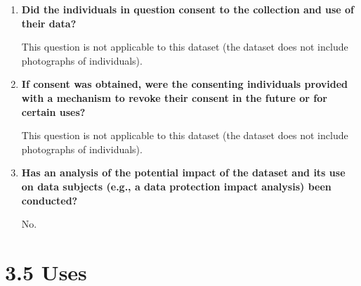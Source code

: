 \documentclass[a4paper,12pt]{article}
\begin{document}
\begin{enumerate}
    \item \textbf{Did the individuals in question consent to the collection and use
    of their data?}

    This question is not applicable to this dataset (the dataset does not include photographs of individuals).

    \item \textbf{If consent was obtained, were the consenting individuals provided with a mechanism to revoke their consent in the future or for certain uses?}
    
    This question is not applicable to this dataset (the dataset does not include photographs of individuals).

    \item \textbf{Has an analysis of the potential impact of the dataset and its use
    on data subjects (e.g., a data protection impact analysis) been conducted?}

    No.

\end{enumerate}



\section*{3.5 Uses}
\end{document}
